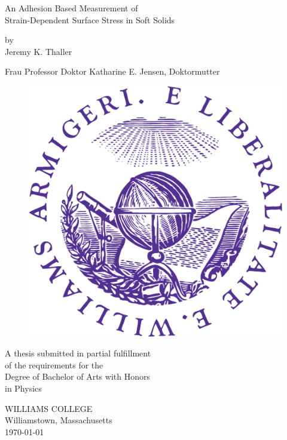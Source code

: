 \documentclass[12pt, oneside]{book}
\begin{document}
\begin{titlepage}
\begin{center}

\vspace*{1.6cm}

{\huge An Adhesion Based Measurement of \\\vspace{.2em} Strain-Dependent Surface Stress in Soft Solids} %

\vspace{2cm}

{\large by\\\vspace{.25em}Jeremy K. Thaller}

\vspace{2cm}
{Frau Professor Doktor Katharine E. Jensen, Doktormutter}

\begin{figure}[h]
	\vspace{.5cm}
	\centering
	\includegraphics[width=.25\textwidth]{Chapters/Figures/seal.PNG}
\end{figure}  

\vfill

A thesis submitted in partial fulfillment\\
of the requirements for the\\
Degree of Bachelor of Arts with Honors\\
in Physics

\vspace*{3cm}

WILLIAMS COLLEGE\\
Williamstown, Massachusetts\\
\today %
\end{center}
\end{titlepage}
\end{document}
